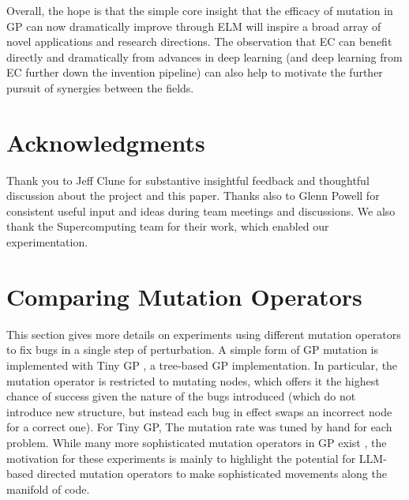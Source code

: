 \documentclass{article}
\begin{document}
Overall, the hope is that the simple core insight that the efficacy of mutation in GP can now dramatically improve through ELM will inspire a broad array of novel applications and research directions.  The observation that EC can benefit directly and dramatically from advances in deep learning (and deep learning from EC further down the invention pipeline) can also help to motivate the further pursuit of synergies between the fields.

















\section*{Acknowledgments}

Thank you to Jeff Clune for substantive insightful feedback and thoughtful discussion about the project and this paper. Thanks also to Glenn Powell for consistent useful input and ideas during team meetings and discussions. We also thank the Supercomputing team for their work, which enabled our experimentation.



\appendix
\section{Comparing Mutation Operators}
\label{appendix:intelligent_perturbation}

This section gives more details on experiments using different mutation operators to fix bugs in a single step of perturbation. A simple form of GP mutation is implemented with Tiny GP \cite{Sipper2019tinyGP}, a tree-based GP implementation. In particular, the mutation operator is restricted to mutating nodes, which offers it the highest chance of success given the nature of the bugs introduced (which do not introduce new structure, but instead each bug in effect swaps an incorrect node for a correct one). For Tiny GP, The mutation rate was tuned by hand for each problem. While many more sophisticated mutation operators in GP exist \cite{salustowicz1997probabilistic,spector2002genetic}, the motivation for these experiments is mainly to highlight the potential for LLM-based directed mutation operators to make sophisticated movements along the manifold of code. 
\end{document}
